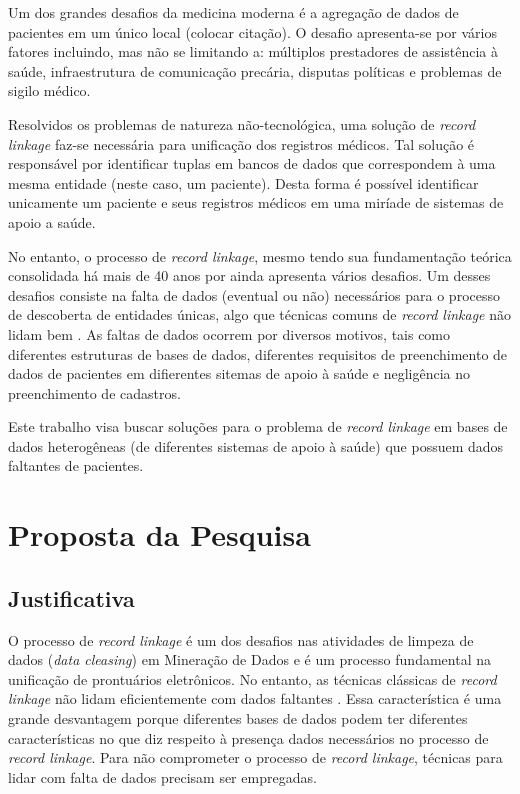 \documentclass[
	12pt,				%
	openany,			%
	twoside,			%
	a4paper,			%
	brazil,				%
	]{unimontes-ppgmsc-abntex2}
\begin{document}
Um dos grandes desafios da medicina moderna é a agregação de dados de pacientes em um único local (colocar citação). O desafio apresenta-se por vários fatores incluindo, mas não se limitando a: múltiplos prestadores de assistência à saúde, infraestrutura de comunicação precária, disputas políticas e problemas de sigilo médico.

Resolvidos os problemas de natureza não-tecnológica, uma solução de \textit{record linkage} faz-se necessária para unificação dos registros médicos. Tal solução é responsável por identificar tuplas em bancos de dados que correspondem à uma mesma entidade (neste caso, um paciente). Desta forma é possível identificar unicamente um paciente e seus registros médicos em uma miríade de sistemas de apoio a saúde.

No entanto, o processo de \textit{record linkage}, mesmo tendo sua fundamentação teórica consolidada há mais de 40 anos por \cite{fellegi} ainda apresenta vários desafios. Um desses desafios consiste na falta de dados (eventual ou não) necessários para o processo de descoberta de entidades únicas, algo que técnicas comuns de \textit{record linkage} não lidam bem \cite{ong}. As faltas de dados ocorrem por diversos motivos, tais como diferentes estruturas de bases de dados, diferentes requisitos de preenchimento de dados de pacientes em difierentes sitemas de apoio à saúde e negligência no preenchimento de cadastros.

Este trabalho visa buscar soluções para o problema de \textit{record linkage} em bases de dados heterogêneas (de diferentes sistemas de apoio à saúde) que possuem dados faltantes de pacientes.


\chapter{Proposta da Pesquisa}

\section{Justificativa}O processo de \textit{record linkage} é um dos desafios nas atividades de limpeza de dados (\textit{data cleasing}) em Mineração de Dados e é um processo fundamental na unificação de prontuários eletrônicos. No entanto, as técnicas clássicas de \textit{record linkage} não lidam eficientemente com dados faltantes \cite{ong}. Essa característica é uma grande desvantagem porque diferentes bases de dados podem ter diferentes características no que diz respeito à presença dados necessários no processo de \textit{record linkage}. Para não comprometer o processo de \textit{record linkage}, técnicas para lidar com falta de dados precisam ser empregadas.
\end{document}
